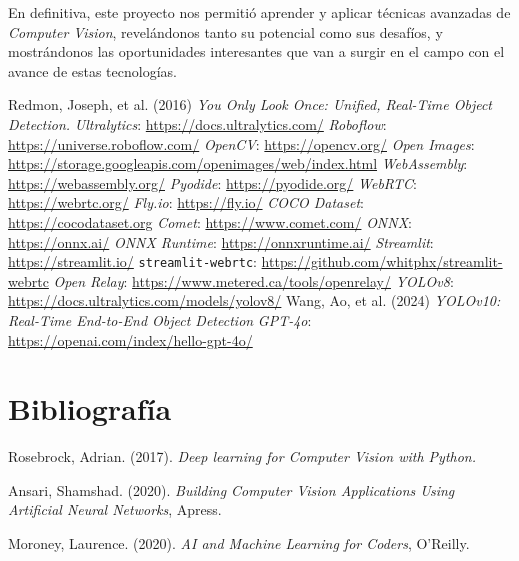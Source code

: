 \documentclass[a4paper]{article}
\begin{document}
En definitiva, este proyecto nos permitió aprender y aplicar técnicas avanzadas de \textit{Computer Vision}, revelándonos tanto su potencial como sus desafíos, y mostrándonos las oportunidades interesantes que van a surgir en el campo con el avance de estas tecnologías.

\newpage
\onehalfspacing

\setcounter{secnumdepth}{0}
\begin{thebibliography}{999}

 Redmon, Joseph, et al. (2016) \textit{You Only Look Once: Unified, Real-Time Object Detection.}
 \textit{Ultralytics}: \url{https://docs.ultralytics.com/}
 \textit{Roboflow}: \url{https://universe.roboflow.com/}
 \textit{OpenCV}: \url{https://opencv.org/}
 \textit{Open Images}: \url{https://storage.googleapis.com/openimages/web/index.html}
 \textit{WebAssembly}: \url{https://webassembly.org/}
 \textit{Pyodide}: \url{https://pyodide.org/}
 \textit{WebRTC}: \url{https://webrtc.org/}
 \textit{Fly.io}: \url{https://fly.io/}
 \textit{COCO Dataset}: \url{https://cocodataset.org}
 \textit{Comet}: \url{https://www.comet.com/}
 \textit{ONNX}: \url{https://onnx.ai/}
 \textit{ONNX Runtime}: \url{https://onnxruntime.ai/}
 \textit{Streamlit}: \url{https://streamlit.io/}
 \texttt{streamlit-webrtc}: \url{https://github.com/whitphx/streamlit-webrtc}
 \textit{Open Relay}: \url{https://www.metered.ca/tools/openrelay/}
 \textit{YOLOv8}: \url{https://docs.ultralytics.com/models/yolov8/}
 Wang, Ao, et al. (2024) \textit{YOLOv10: Real-Time End-to-End Object Detection}
 \textit{GPT-4o}: \url{https://openai.com/index/hello-gpt-4o/}

\end{thebibliography}

\section{Bibliografía}

Rosebrock, Adrian. (2017). \textit{Deep learning for Computer Vision with Python.}

Ansari, Shamshad. (2020). \textit{Building Computer Vision Applications Using Artificial Neural Networks}, Apress.

Moroney, Laurence. (2020). \textit{AI and Machine Learning for Coders}, O'Reilly.
\end{document}
